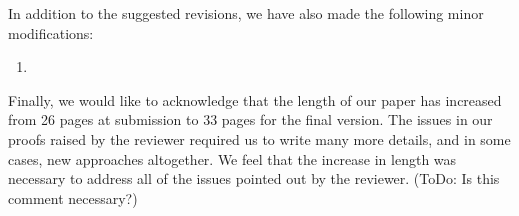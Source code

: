 \documentclass[]{article}
\begin{document}
\hspace{-7mm} In addition to the suggested revisions, we have also made the following minor modifications:
\begin{enumerate}
	\item 
\end{enumerate}

Finally, we would like to acknowledge that the length of our paper has increased from 26 pages at submission to 33 pages for the final version. The issues in our proofs raised by the reviewer required us to write many more details, and in some cases, new approaches altogether. We feel that the increase in length was necessary to address all of the issues pointed out by the reviewer. (ToDo: Is this comment necessary?)
\end{document}
